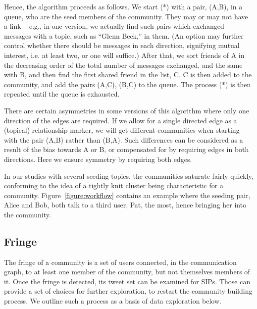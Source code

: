 Hence, the algorithm proceeds as follows.  We start (*) with a pair, (A,B), in a queue, who are the seed members of the community.  They may or may not have a link -- e.g., in one version, we actually find such pairs which exchanged messages with a topic, such as ``Glenn Beck,'' in them.  (An option may further control whether there should be messages in each direction, signifying mutual interest, i.e. at least two, or one will suffice.)  After that, we sort friends of A in the decreasing order of the total number of messages exchanged, and the same with B, and then find the first shared friend in the list, C.  C is then added to the community, and add the pairs (A,C), (B,C) to the queue.  The process (*) is then repeated until the queue is exhausted.

There are certain asymmetries in some versions of this algorithm where only one direction of the edges are required.  If we allow for a single directed edge as a (topical) relationship marker, we will get different communities when starting with the pair (A,B) rather than (B,A).  Such differences can be considered as a result of the bias towards A or B, or compensated for by requiring edges in both directions.  Here we ensure symmetry by requiring both edges.

In our studies with several seeding topics, the communities saturate fairly quickly, conforming to the idea of a tightly knit cluster \cite{DBLP:conf/waw/MishraSST07} being characteristic for a community.  Figure~\ref{figure:workflow} contains an example where the seeding pair, Alice and Bob, both talk to a third user, Pat, the most, hence bringing her into the community.

\subsection{Fringe}

The fringe of a community is a set of users connected, in the communication graph, to at least one member of the community, but not themselves members of it.  Once the fringe is detected, its tweet set can be examined for SIPs.  Those can provide a set of choices for further exploration, to restart the community building process.  We outline such a process as a basis of data exploration below.
